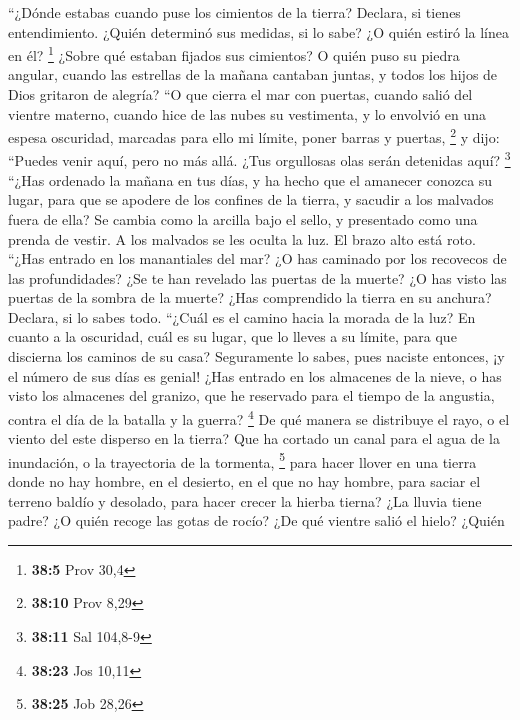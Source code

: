 \begin{paracol}{2}
 ``¿Dónde estabas cuando puse los cimientos de la tierra?
Declara, si tienes entendimiento.  ¿Quién determinó sus
medidas, si lo sabe? ¿O quién estiró la línea en él? \footnote{\textbf{38:5}
  Prov 30,4}  ¿Sobre qué estaban fijados sus cimientos? O
quién puso su piedra angular,  cuando las estrellas de la
mañana cantaban juntas, y todos los hijos de Dios gritaron de alegría?
 ``O que cierra el mar con puertas, cuando salió del
vientre materno,  cuando hice de las nubes su vestimenta,
y lo envolvió en una espesa oscuridad,  marcadas para
ello mi límite, poner barras y puertas, \footnote{\textbf{38:10} Prov
  8,29}  y dijo: ``Puedes venir aquí, pero no más allá.
¿Tus orgullosas olas serán detenidas aquí? \footnote{\textbf{38:11} Sal
  104,8-9}  ``¿Has ordenado la mañana en tus días, y ha
hecho que el amanecer conozca su lugar,  para que se
apodere de los confines de la tierra, y sacudir a los malvados fuera de
ella?  Se cambia como la arcilla bajo el sello, y
presentado como una prenda de vestir.  A los malvados se
les oculta la luz. El brazo alto está roto.  ``¿Has
entrado en los manantiales del mar? ¿O has caminado por los recovecos de
las profundidades?  ¿Se te han revelado las puertas de la
muerte? ¿O has visto las puertas de la sombra de la muerte?
 ¿Has comprendido la tierra en su anchura? Declara, si lo
sabes todo.  ``¿Cuál es el camino hacia la morada de la
luz? En cuanto a la oscuridad, cuál es su lugar,  que lo
lleves a su límite, para que discierna los caminos de su casa?
 Seguramente lo sabes, pues naciste entonces, ¡y el
número de sus días es genial!  ¿Has entrado en los
almacenes de la nieve, o has visto los almacenes del granizo,
 que he reservado para el tiempo de la angustia, contra
el día de la batalla y la guerra? \footnote{\textbf{38:23} Jos 10,11}
 De qué manera se distribuye el rayo, o el viento del
este disperso en la tierra?  Que ha cortado un canal para
el agua de la inundación, o la trayectoria de la tormenta, \footnote{\textbf{38:25}
  Job 28,26}  para hacer llover en una tierra donde no
hay hombre, en el desierto, en el que no hay hombre, 
para saciar el terreno baldío y desolado, para hacer crecer la hierba
tierna?  ¿La lluvia tiene padre? ¿O quién recoge las
gotas de rocío?  ¿De qué vientre salió el hielo? ¿Quién

\end{paracol}
